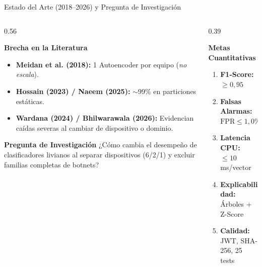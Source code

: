 \documentclass[aspectratio=169, 10pt]{beamer}
\begin{document}
\begin{frame}{Estado del Arte (2018--2026) y Pregunta de Investigación}
  \begin{columns}[T]
    \begin{column}{0.56\textwidth}
      \begin{block}{\textbf{Brecha en la Literatura}}
        \footnotesize
        \begin{itemize}
          \item \textbf{Meidan et al. (2018):} 1 Autoencoder por equipo (\textit{no escala}).
          \item \textbf{Hossain (2023) / Naeem (2025):} $\sim$99\% en particiones estáticas.
          \item \textbf{Wardana (2024) / Bhilwarawala (2026):} Evidencian caídas severas al cambiar de dispositivo o dominio.
        \end{itemize}
      \end{block}
      \vspace{1mm}
      \begin{alertblock}{\textbf{Pregunta de Investigación}}
        \footnotesize
        ¿Cómo cambia el desempeño de clasificadores livianos al separar dispositivos (6/2/1) y excluir familias completas de botnets?
      \end{alertblock}
    \end{column}
    \begin{column}{0.39\textwidth}
      \begin{exampleblock}{\textbf{Metas Cuantitativas}}
        \footnotesize
        \begin{enumerate}
          \item \textbf{F1-Score:} $\ge 0{,}95$
          \item \textbf{Falsas Alarmas:} $\text{FPR} \le 1{,}0\%$
          \item \textbf{Latencia CPU:} $\le 10$ ms/vector
          \item \textbf{Explicabilidad:} Árboles + Z-Score
          \item \textbf{Calidad:} JWT, SHA-256, 25 tests
        \end{enumerate}
      \end{exampleblock}
    \end{column}
  \end{columns}
\end{frame}
\end{document}
